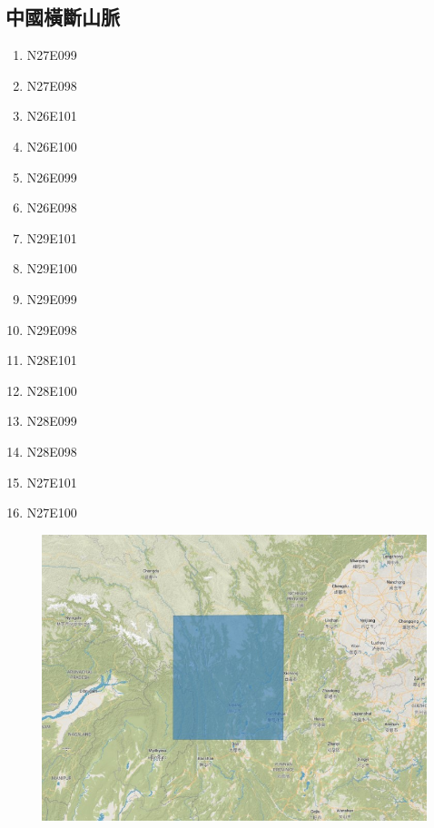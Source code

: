 \documentclass[a4paper, 12pt]{article}
\begin{document}
\begin{appendices}
    \subsection{中國橫斷山脈}
    \begin{multicols}{4}
        \begin{enumerate}
            \item N27E099
            \item N27E098
            \item N26E101
            \item N26E100
            \item N26E099
            \item N26E098
            \item N29E101
            \item N29E100
            \item N29E099
            \item N29E098
            \item N28E101
            \item N28E100
            \item N28E099
            \item N28E098
            \item N27E101
            \item N27E100
        \end{enumerate}
    \end{multicols}
    \begin{figure}[H]
        \centering
        \includegraphics[width=0.8\linewidth]{fig/a1.jpg}
    \end{figure}

\end{appendices}
\end{document}
